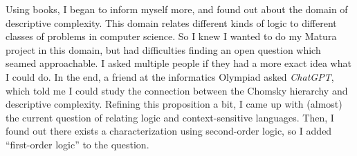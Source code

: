 Using books, I began to inform myself more, and found out about the domain of descriptive complexity.
This domain relates different kinds of logic to different classes of problems in computer science.
So I knew I wanted to do my Matura project in this domain, but had difficulties finding an open question which seamed approachable.
I asked multiple people if they had a more exact idea what I could do.
In the end, a friend at the informatics Olympiad asked \emph{ChatGPT}, which told me I could study the connection between the Chomsky hierarchy and descriptive complexity.
Refining this proposition a bit, I came up with (almost) the current question of relating logic and context-sensitive languages.
Then, I found out there exists a characterization using second-order logic, so I added ``first-order logic'' to the question.
